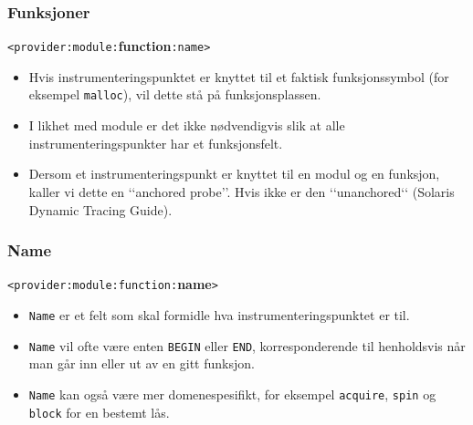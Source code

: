 \documentclass{beamer}
\begin{document}
 \begin{frame}
     \frametitle{Funksjoner}
     \texttt{<provider:module:}\textbf{function}\texttt{:name>}

     \begin{itemize}

         \item Hvis instrumenteringspunktet er knyttet til et faktisk funksjonssymbol
    (for eksempel \texttt{malloc}), vil dette stå på funksjonsplassen.

        \item I likhet med module er det ikke nødvendigvis slik at alle
      instrumenteringspunkter har et funksjonsfelt.

        \item Dersom et instrumenteringspunkt er knyttet til en modul
    og en funksjon, kaller vi dette en ‘‘anchored probe’’. Hvis
    ikke er den ‘‘unanchored‘‘ (Solaris Dynamic Tracing Guide).
     \end{itemize}
 \end{frame}

 \begin{frame}
     \frametitle{Name}
     \texttt{<provider:module:function:}\textbf{name}\texttt{>}

    \begin{itemize}
        \item \texttt{Name} er et felt som skal formidle hva instrumenteringspunktet er til.

        \item \texttt{Name} vil ofte være enten \texttt{BEGIN} eller \texttt{END}, korresponderende
    til henholdsvis når man går inn eller ut av en gitt funksjon.

\item \texttt{Name} kan også være mer domenespesifikt, for eksempel \texttt{acquire}, \texttt{spin}
    og \texttt{block} for en bestemt lås.

\end{itemize}
 \end{frame}
\end{document}
